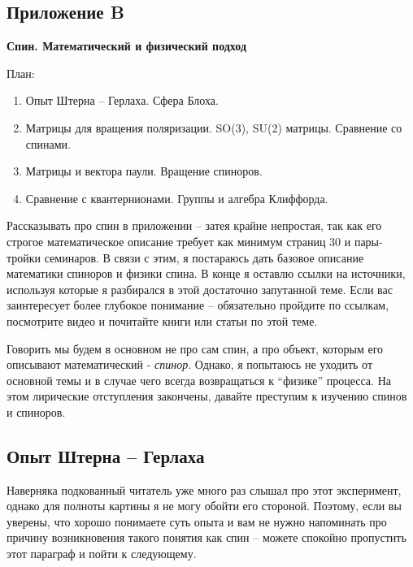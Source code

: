 \begin{center}
    \section{Приложение B}\label{appendix:B}
    \textbf{\Large{Спин. Математический и физический подход}}
\end{center}

План:
\begin{enumerate}
    \item Опыт Штерна -- Герлаха. Сфера Блоха.
    \item Матрицы для вращения поляризации. SO(3), SU(2) матрицы. Сравнение со спинами.
    \item Матрицы и вектора паули. Вращение спиноров.
    \item Сравнение с квантернионами. Группы и алгебра Клиффорда.
\end{enumerate}

Рассказывать про спин в приложении -- затея крайне непростая, так как его строгое математическое описание требует как минимум страниц 30 и пары-тройки семинаров. В связи с этим, я постараюсь дать базовое описание математики спиноров и физики спина. В конце я оставлю ссылки на источники, используя которые я разбирался в этой достаточно запутанной теме. Если вас заинтересует более глубокое понимание -- обязательно пройдите по ссылкам, посмотрите видео и почитайте книги или статьи по этой теме. 

Говорить мы будем в основном не про сам спин, а про объект, которым его описывают математический -  \textit{спинор}. Однако, я попытаюсь не уходить от основной темы и в случае чего всегда возвращаться к ``физике'' процесса. На этом лирические отступления закончены, давайте преступим к изучению спинов и спиноров.

\subsection{Опыт Штерна -- Герлаха}
\hspace{1em} Наверняка подкованный читатель уже много раз слышал про этот эксперимент, однако для полноты картины я не могу обойти его стороной. Поэтому, если вы уверены, что хорошо понимаете суть опыта и вам не нужно напоминать про причину возникновения такого понятия как спин -- можете спокойно пропустить этот параграф и пойти к следующему.

